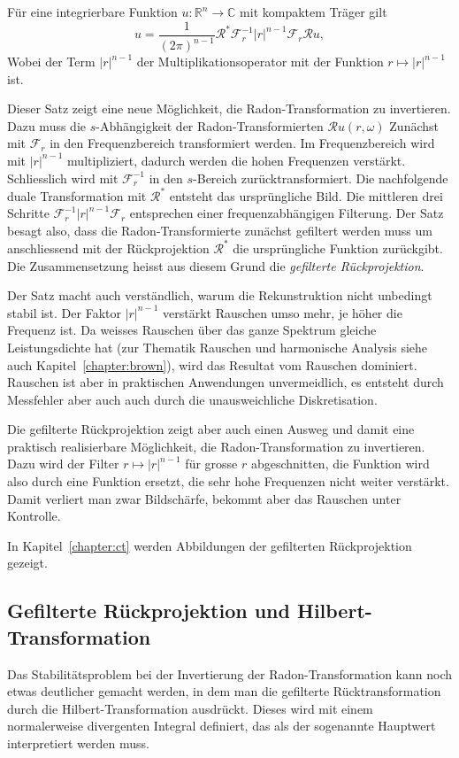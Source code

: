 \begin{satz}
Für eine integrierbare Funktion $u\colon\mathbb{R}^n\to\mathbb{C}$ mit kompaktem Träger gilt
\[
u
=
\frac{1}{(2\pi)^{n-1}}
\mathscr{R}^*
\mathscr{F}_r^{-1}
|r|^{n-1}
\mathscr{F}_r
\mathscr{R}u,
\]
Wobei der Term $|r|^{n-1}$ der Multiplikationsoperator mit der
Funktion $r\mapsto |r|^{n-1}$ ist.
\end{satz}

Dieser Satz zeigt eine neue Möglichkeit, die Radon-Transformation
zu invertieren.
Dazu muss die $s$-Abhängigkeit der Radon-Transformierten
$\mathscr{R}u(r,\omega)$ 
Zunächst mit $\mathscr{F}_r$ in den Frequenzbereich transformiert werden.
Im Frequenzbereich wird mit $|r|^{n-1}$ multipliziert, dadurch
werden die hohen Frequenzen verstärkt.
Schliesslich wird mit $\mathscr{F}_r^{-1}$ in den $s$-Bereich
zurücktransformiert.
Die nachfolgende duale Transformation mit $\mathscr{R}^*$ entsteht
das ursprüngliche Bild.
Die mittleren drei Schritte $\mathscr{F}_r^{-1}|r|^{n-1}\mathscr{F}_r$
entsprechen einer frequenzabhängigen Filterung.
Der Satz besagt also, dass die Radon-Transformierte zunächst
gefiltert werden muss um anschliessend mit der Rückprojektion
$\mathscr{R}^*$ die ursprüngliche Funktion zurückgibt.
Die Zusammensetzung heisst aus diesem Grund die {\em gefilterte
Rückprojektion}.

Der Satz macht auch verständlich, warum die Rekunstruktion nicht
unbedingt stabil ist. 
Der Faktor $|r|^{n-1}$ verstärkt Rauschen umso mehr, je höher
die Frequenz ist.
Da weisses Rauschen über das ganze Spektrum gleiche Leistungsdichte
hat (zur Thematik Rauschen und harmonische Analysis siehe auch 
Kapitel~\ref{chapter:brown}),
wird das Resultat vom Rauschen dominiert.
Rauschen ist aber in praktischen Anwendungen unvermeidlich, es
entsteht durch Messfehler aber auch auch durch die unausweichliche
Diskretisation.

Die gefilterte Rückprojektion zeigt aber auch einen Ausweg und 
damit eine praktisch realisierbare Möglichkeit, die Radon-Transformation
zu invertieren.
Dazu wird der Filter $r\mapsto |r|^{n-1}$ für grosse $r$ abgeschnitten,
die Funktion wird also durch eine Funktion ersetzt, die sehr
hohe Frequenzen nicht weiter verstärkt.
Damit verliert man zwar Bildschärfe, bekommt aber das Rauschen unter
Kontrolle.

In Kapitel~\ref{chapter:ct} werden Abbildungen der gefilterten
Rückprojektion gezeigt.

%
%
\subsection{Gefilterte Rückprojektion und Hilbert-Transformation}
Das Stabilitätsproblem bei der Invertierung der Radon-Transformation
kann noch etwas deutlicher gemacht werden, in dem man die gefilterte
Rücktransformation durch die Hilbert-Transformation ausdrückt.
Dieses wird mit einem normalerweise divergenten Integral definiert,
das als der sogenannte Hauptwert interpretiert werden muss.

